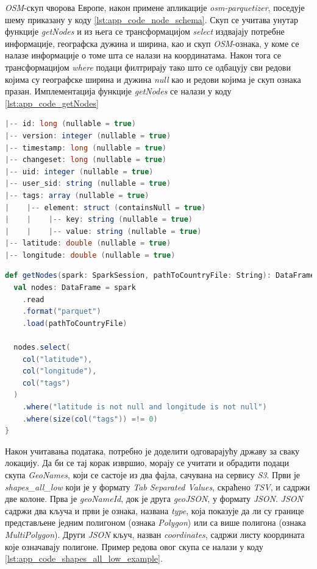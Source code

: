 \documentclass[12pt,oneside]{memoir}
\begin{document}
\textit{OSM}-скуп чворова Европе, након примене апликације \textit{osm-parquetizer}, поседује шему приказану у коду \ref{lst:app_code_node_schema}. Скуп се учитава унутар функције \textit{getNodes} и из њега се трансформацијом \textit{select} издвајају потребне информације, географска дужина и ширина, као и скуп \textit{OSM}-ознака, у коме се налазе информације о томе шта се налази на координатама. Након тога се трансформацијом \textit{where} подаци филтрирају тако што се одбацују сви редови којима су географске ширина и дужина \textit{null} као и редови којима је скуп ознака празан. Имплементација функције \textit{getNodes} се налази у коду \ref{lst:app_code_getNodes}

\begin{lstlisting}[caption={Шема \textit{OSM}-скупа чворова након примене апликације \textit{osm-parquetizer}}, language=Scala, label={lst:app_code_node_schema}]
|-- id: long (nullable = true)
|-- version: integer (nullable = true)
|-- timestamp: long (nullable = true)
|-- changeset: long (nullable = true)
|-- uid: integer (nullable = true)
|-- user_sid: string (nullable = true)
|-- tags: array (nullable = true)
|    |-- element: struct (containsNull = true)
|    |    |-- key: string (nullable = true)
|    |    |-- value: string (nullable = true)
|-- latitude: double (nullable = true)
|-- longitude: double (nullable = true)
\end{lstlisting}

\begin{lstlisting}[caption={Функција која учитава податке и извршава иницијално филтрирање колона и редова}, language=Scala, label={lst:app_code_getNodes}]
def getNodes(spark: SparkSession, pathToCountryFile: String): DataFrame = {
  val nodes: DataFrame = spark
    .read
    .format("parquet")
    .load(pathToCountryFile)

  nodes.select(
    col("latitude"),
    col("longitude"),
    col("tags")
  )
    .where("latitude is not null and longitude is not null")
    .where(size(col("tags")) =!= 0)
}
\end{lstlisting}

Након учитавања података, потребно је доделити одговарајућу државу за сваку локацију. Да би се тај корак извршио, морају се учитати и обрадити подаци скупа \textit{GeoNames}, који се састоје из два фајла, сачувана на сервису \textit{S3}. Први је \textit{shapes\_all\_low} који је у формату \textit{Tab Separated Values}, скраћено \textit{TSV}, и садржи две колоне. Прва је \textit{geoNameId}, док је друга \textit{geoJSON}, у формату \textit{JSON}. \textit{JSON} садржи два кључа и први је ознака, названа \textit{type}, која показује да ли су границе представљене једним полигоном (ознака \textit{Polygon}) или са више полигона (ознака \textit{MultiPolygon}). Други \textit{JSON} кључ, назван \textit{coordinates}, садржи листу координата које означавају полигоне. Пример редова овог скупа се налази у коду \ref{lst:app_code_shapes_all_low_example}.
\end{document}

